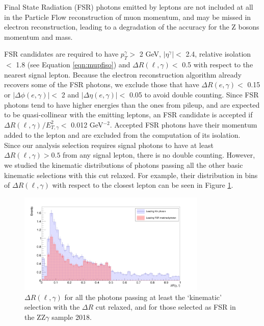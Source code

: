 Final State Radiation (FSR) photons emitted by leptons are not included at all in the Particle Flow reconstruction of muon momentum, and may be missed in electron reconstruction, leading to a degradation of the accuracy for the Z bosons momentum and mass.

FSR candidates are required to have $p_{T}^{\gamma} >$ 2 GeV, $|\eta^{\gamma}| <$ 2.4, relative isolation $<$ 1.8 (see Equation \ref{eqn:mupfiso}) and $\Delta R(\ell, \gamma) <$ 0.5 with respect to the nearest signal lepton.
Because the electron reconstruction algorithm already recovers some of the FSR photons, we exclude those that have $\Delta R(e, \gamma) <$ 0.15 or $|\Delta\phi(e, \gamma)| <$ 2 and $|\Delta\eta(e, \gamma)| <$ 0.05 to avoid double counting.
Since FSR photons tend to have higher energies than the ones from pileup, and are expected to be quasi-collinear with the emitting leptons, an FSR candidate is accepted if $\Delta R(\ell, \gamma)^{} / E_{T,\gamma}^{2} <$ 0.012 GeV$^{-2}$.
Accepted FSR photons have their momentum added to the lepton and are excluded from the computation of its isolation.
\\
Since our analysis selection requires signal photons to have at least $\Delta R(\ell, \gamma) > 0.5$ from any signal lepton, there is no double counting.
However, we studied the kinematic distributions of photons passing all the other basic kinematic selections with this cut relaxed.
For example, their distribution in bins of $\Delta R(\ell, \gamma)$ with respect to the closest lepton
can be seen in Figure \ref{fig:dRl_fsr_photons}.
\begin{figure}[ht]
\begin{center}
        \includegraphics[width=0.8\textwidth]{Figures/lead_dRl_kin_vs_fsrMatched_rebinned.png}
\end{center}
\caption{$\Delta R(\ell, \gamma)$ for all the photons passing at least the `kinematic' selection with the $\Delta R$ cut relaxed, and for those selected as FSR in the ZZ$\gamma$ sample 2018.}
\label{fig:dRl_fsr_photons}
\end{figure}
